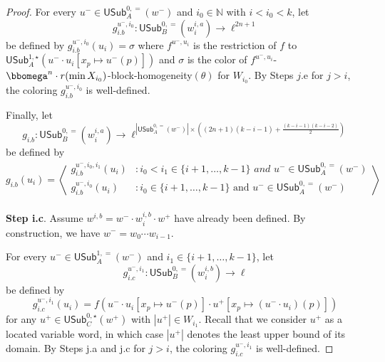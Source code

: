 \documentclass{article}
\numberwithin{theorem}{section}
\newcommand{\NN}{\mathbb{N}}
\newcommand{\USub}{\mathsf{USub}}
\begin{document}
\begin{proof}
For every $u^- \in \USub_A^{0,=}(w^-)$ and $i_0 \in \NN$ with $i < i_0 < k$, let $$g_{i.b}^{u^-,i_0} : \USub_{B}^{0,=}(w^{i,a}_i) \to \ell^{2n+1}$$ be defined by $g_{i.b}^{u^-, i_0}(u_i) = \sigma$
where $f^{u^-, u_i}$ is the restriction of $f$ to $\USub^{1,\star}_A(u^- \cdot u_i[x_p \mapsto u^-(p)])$ and $\sigma$ is the color of $f^{u^-,u_i}$-$\bbomega^n \cdot r(\min X_{i_0})$-block-homogeneity$(\theta)$ for $W_{i_0}$.
By Steps $j$.e for $j > i$, the coloring $g_{i.b}^{u^-, i_0}$ is well-defined.

Finally, let 
$$g_{i.b} : \USub_{B}^{0,=}(w^{i,a}_i) \to \ell^{|\USub_A^{0,=}(w^-)|\times \left((2n+1)(k-i-1) + \frac{(k-i-1)(k-i-2)}{2}\right)}$$
be defined by $$g_{i.b}(u_i) = \left\langle \begin{array}{ll}
    g_{i.b}^{u^-, i_0, i_1}(u_i) &: i_0 < i_1 \in \{i+1, \dots, k-1\} \textit{ and } u^- \in \USub_A^{0,=}(w^-)\\
    g_{i.b}^{u^-, i_0}(u_i) &: i_0 \in \{i+1, \dots, k-1\} \text{ and } u^- \in \USub_A^{0,=}(w^-)\\
    \end{array}\right\rangle$$


\smallskip

\noindent
\textbf{Step i.c}. Assume $w^{i,b} = w^- \cdot w^{i,b}_i \cdot w^+$ have already been defined. By construction, we have $w^- = w_0 \cdots w_{i-1}$.

For every $u^- \in \USub_A^{1,=}(w^-)$ and $i_1 \in \{i+1, \dots, k-1\}$, let $$g_{i.c}^{u^-,i_1} : \USub_{B}^{0,=}(w^{i,b}_i) \to \ell$$ be defined by
$$g_{i.c}^{u^-,i_1}(u_i) = f(u^- \cdot u_i[x_p \mapsto u^-(p)] \cdot u^+[x_p \mapsto (u^- \cdot u_i)(p)])$$ for any $u^+ \in \USub_C^{0,\star}(w^+)$ with $|u^+| \in W_{i_1}$. Recall that we consider $u^+$ as a located variable word, in which case $|u^+|$ denotes the least upper bound of its domain. By Steps j.a and j.c for $j > i$, the coloring $g_{i.c}^{u^-,i_1}$ is well-defined.


\end{proof}
\end{document}
